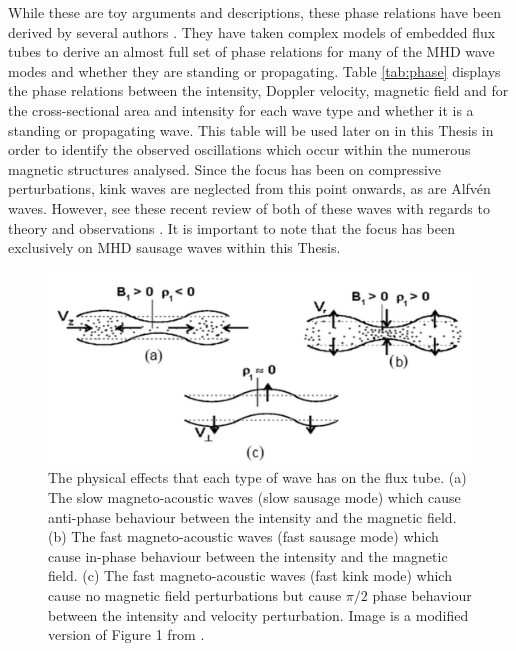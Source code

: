     While these are toy arguments and descriptions, these phase relations have been derived by several authors \citep{PMHDW,Moreels2013,Moreels2013b,2015A&A...579A..73M}.
    They have taken complex models of embedded flux tubes to derive an almost full set of phase relations for many of the MHD wave modes and whether they are standing or propagating.  
    Table \ref{tab:phase} displays the phase relations between the intensity, Doppler velocity, magnetic field and for the cross-sectional area and intensity for each wave type and whether it is a standing or propagating wave.
    This table will be used later on in this Thesis in order to identify the observed oscillations which occur within the numerous magnetic structures analysed. 
    Since the focus has been on compressive perturbations, kink waves are neglected from this point onwards, as are Alfv\'en waves.
    However, see these recent review of both of these waves with regards to theory and observations \citep{Mathioudakis2013,jess2015multiwavelength}.
    It is important to note that the focus has been exclusively on MHD sausage waves within this Thesis.
    
    \begin{figure}
        \centering
        \includegraphics[width=\textwidth]{tube}
        \caption{
                 The physical effects that each type of wave has on the flux tube.
                 (a) The slow magneto-acoustic waves (slow sausage mode) which cause anti-phase behaviour between the intensity and the magnetic field.
                 (b) The fast magneto-acoustic waves (fast sausage mode) which cause in-phase behaviour between the intensity and the magnetic field.
                 (c) The fast magneto-acoustic waves (fast kink mode) which cause no magnetic field perturbations but cause $\pi/2$ phase behaviour between the intensity and velocity perturbation.
                 Image is a modified version of Figure 1 from \cite{CLOO}.
                }
        \label{fig:tube}
    \end{figure}
      
